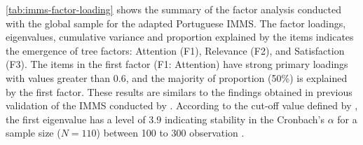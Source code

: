\autoref{tab:imms-factor-loading} shows the summary of the factor analysis conducted with the global sample for the adapted Portuguese IMMS. The factor loadings, eigenvalues, cumulative variance and proportion explained by the items indicates the emergence of tree factors: Attention (F1), Relevance (F2), and Satisfaction (F3). The items in the first factor (F1: Attention) have strong primary loadings with values greater than 0.6, and the majority of proportion (50\%) is explained by the first factor. These results are similars to the findings obtained in previous validation of the IMMS conducted by . According to the cut-off value defined by , the first eigenvalue has a level of $3.9$ indicating stability in the Cronbach’s $\alpha$ for a sample size ($N=110$) between 100 to 300 observation .


